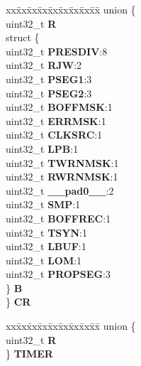 \begin{DoxyCompactItemize}
\begin{tabbing}
\end{tabbing}\item 
\mbox{\label{structFLEXCAN2__tag_a0518f82fee9645c127bf8a7f3b35f9ce}} 
\begin{tabbing}
xx\=xx\=xx\=xx\=xx\=xx\=xx\=xx\=xx\=\kill
union \{\\
\>uint32\_t {\bfseries R}\\
\>struct \{\\
\>\>uint32\_t {\bfseries PRESDIV}:8\\
\>\>uint32\_t {\bfseries RJW}:2\\
\>\>uint32\_t {\bfseries PSEG1}:3\\
\>\>uint32\_t {\bfseries PSEG2}:3\\
\>\>uint32\_t {\bfseries BOFFMSK}:1\\
\>\>uint32\_t {\bfseries ERRMSK}:1\\
\>\>uint32\_t {\bfseries CLKSRC}:1\\
\>\>uint32\_t {\bfseries LPB}:1\\
\>\>uint32\_t {\bfseries TWRNMSK}:1\\
\>\>uint32\_t {\bfseries RWRNMSK}:1\\
\>\>uint32\_t {\bfseries \_\_pad0\_\_}:2\\
\>\>uint32\_t {\bfseries SMP}:1\\
\>\>uint32\_t {\bfseries BOFFREC}:1\\
\>\>uint32\_t {\bfseries TSYN}:1\\
\>\>uint32\_t {\bfseries LBUF}:1\\
\>\>uint32\_t {\bfseries LOM}:1\\
\>\>uint32\_t {\bfseries PROPSEG}:3\\
\>\} {\bfseries B}\\
\} {\bfseries CR}\\

\end{tabbing}\item 
\mbox{\label{structFLEXCAN2__tag_aed57aff75743ac5b233f822517651180}} 
\begin{tabbing}
xx\=xx\=xx\=xx\=xx\=xx\=xx\=xx\=xx\=\kill
union \{\\
\>uint32\_t {\bfseries R}\\
\} {\bfseries TIMER}\\


\end{tabbing}
\end{DoxyCompactItemize}
